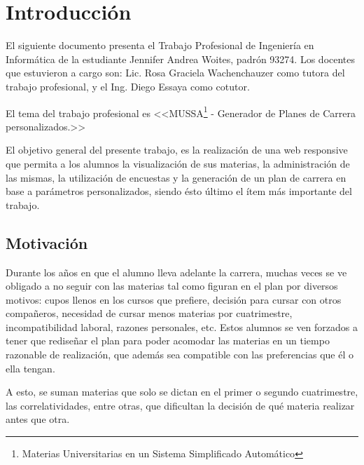 \documentclass[a4paper]{article}
\begin{document}
  \newpage
  

  \tableofcontents %
    
  \pagestyle{fancy}
  \rhead{}
  \renewcommand{\headrulewidth}{0.4pt} %

  \newpage


\section{Introducción}

El siguiente documento presenta el Trabajo Profesional de Ingeniería en Informática de la estudiante Jennifer Andrea Woites, padrón 93274. Los docentes que estuvieron a cargo son: Lic. Rosa Graciela Wachenchauzer como tutora del trabajo profesional, y el Ing. Diego Essaya como cotutor. \newline

El tema del trabajo profesional es <<MUSSA\footnote{Materias Universitarias en un Sistema Simplificado Automático} - Generador de Planes de Carrera personalizados.>> \newline

El objetivo general del presente trabajo, es la realización de una web responsive que permita a los alumnos la visualización de sus materias, la administración de las mismas, la utilización de encuestas y la generación de un plan de carrera en base a parámetros personalizados, siendo ésto último el ítem más importante del trabajo.

\subsection{Motivación}

Durante los años en que el alumno lleva adelante la carrera, muchas veces se ve obligado a no seguir con las materias tal como figuran en el plan por diversos motivos: cupos llenos en los cursos que prefiere, decisión para cursar con otros compañeros, necesidad de cursar menos materias por cuatrimestre, incompatibilidad laboral, razones personales, etc. Estos alumnos se ven forzados a tener que rediseñar el plan para poder acomodar las materias en un tiempo razonable de realización, que además sea compatible con las preferencias que él o ella tengan.

A esto, se suman materias que solo se dictan en el primer o segundo cuatrimestre, las correlatividades, entre otras, que dificultan la decisión de qué materia realizar antes que otra.
\end{document}

